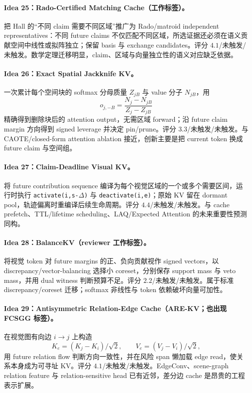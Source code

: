 \documentclass[UTF8,zihao=-4,a4paper]{ctexart}
\begin{document}
\paragraph{Idea 25：Rado-Certified Matching Cache（工作标签）。}
把 Hall 的“不同 claim 需要不同区域”推广为 Rado/matroid independent representatives：不同 future claims 不仅匹配不同区域，所选证据还必须在语义贡献空间中线性或拟阵独立；保留 basis 与 exchange candidates。评分 $4.1$/未触发/未触发。数学定理迁移明显，claim、区域与向量独立性的语义对应缺乏依据。

\paragraph{Idea 26：Exact Spatial Jackknife KV。}
一次累计每个空间块的 softmax 分母质量 $Z_{jB}$ 与 value 分子 $N_{jB}$，用
\[
o_{j,-B}=\frac{N_j-N_{jB}}{Z_j-Z_{jB}}
\]
精确得到删除块后的 attention output，无需区域 forward；沿 future claim margin 方向得到 signed leverage 并决定 pin/prune。评分 $3.3$/未触发/未触发。与 CAOTE/closed-form attention ablation 接近，创新主要是把 current token 换成 future claim 与空间组。

\paragraph{Idea 27：Claim-Deadline Visual KV。}
将 future contribution sequence 编译为每个视觉区域的一个或多个需要区间，运行时执行 \texttt{activate(i,s-$\Delta$)} 与 \texttt{deactivate(i,e)}；原始 KV 留在 dormant pool，轨迹偏离时重编译后续生命周期。评分 $4.4$/未触发/未触发。与 cache prefetch、TTL/lifetime scheduling、LAQ/Expected Attention 的未来重要性预测同构。

\paragraph{Idea 28：BalanceKV（reviewer 工作标签）。}
将视觉 token 对 future margins 的正、负向贡献视作 signed vectors，以 discrepancy/vector-balancing 选择小 coreset，分别保存 support mass 与 veto mass，并用 dual witness 判断预算不足。评分 $2.2$/未触发/未触发。属于标准 discrepancy/coreset 迁移；softmax 非线性与 token 依赖破坏向量可加性。

\paragraph{Idea 29：Antisymmetric Relation-Edge Cache（ARE-KV；也出现 FCSGG 标签）。}
在视觉图有向边 $i\to j$ 上构造
\[
K_e=(K_j-K_i)/\sqrt2,\qquad
V_e=(V_j-V_i)/\sqrt2,
\]
用 future relation flow 判断方向一致性，并在风险 span 懒加载 edge read，使关系本身成为可寻址 KV。评分 $4.1$/未触发/未触发。EdgeConv、scene-graph relation feature 与 relation-sensitive head 已有近邻，差分边 cache 是昂贵的工程表示扩展。
\end{document}
